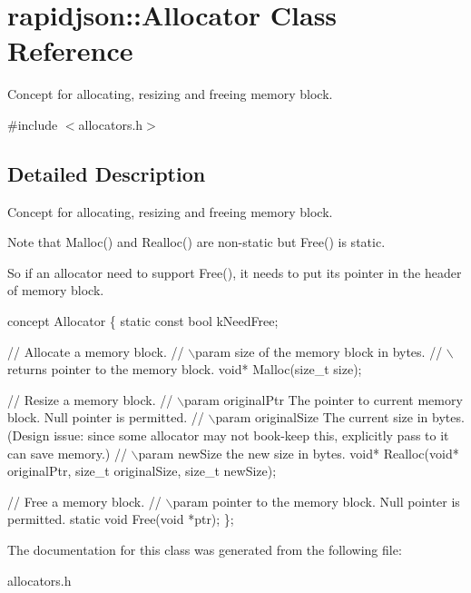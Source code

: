\hypertarget{a00034}{}\section{rapidjson\+:\+:Allocator Class Reference}
\label{a00034}


Concept for allocating, resizing and freeing memory block.  




{\ttfamily \#include $<$allocators.\+h$>$}



\subsection{Detailed Description}
Concept for allocating, resizing and freeing memory block. 

Note that Malloc() and Realloc() are non-\/static but Free() is static.

So if an allocator need to support Free(), it needs to put its pointer in the header of memory block.


\begin{DoxyCode}
concept Allocator \{
    \textcolor{keyword}{static} \textcolor{keyword}{const} \textcolor{keywordtype}{bool} kNeedFree;    

    \textcolor{comment}{// Allocate a memory block.}
    \textcolor{comment}{// \(\backslash\)param size of the memory block in bytes.}
    \textcolor{comment}{// \(\backslash\)returns pointer to the memory block.}
    \textcolor{keywordtype}{void}* Malloc(\textcolor{keywordtype}{size\_t} size);

    \textcolor{comment}{// Resize a memory block.}
    \textcolor{comment}{// \(\backslash\)param originalPtr The pointer to current memory block. Null pointer is permitted.}
    \textcolor{comment}{// \(\backslash\)param originalSize The current size in bytes. (Design issue: since some allocator may not book-keep
       this, explicitly pass to it can save memory.)}
    \textcolor{comment}{// \(\backslash\)param newSize the new size in bytes.}
    \textcolor{keywordtype}{void}* Realloc(\textcolor{keywordtype}{void}* originalPtr, \textcolor{keywordtype}{size\_t} originalSize, \textcolor{keywordtype}{size\_t} newSize);

    \textcolor{comment}{// Free a memory block.}
    \textcolor{comment}{// \(\backslash\)param pointer to the memory block. Null pointer is permitted.}
    \textcolor{keyword}{static} \textcolor{keywordtype}{void} Free(\textcolor{keywordtype}{void} *ptr);
\};
\end{DoxyCode}
 

The documentation for this class was generated from the following file\+:\begin{DoxyCompactItemize}
\item 
allocators.\+h\end{DoxyCompactItemize}
